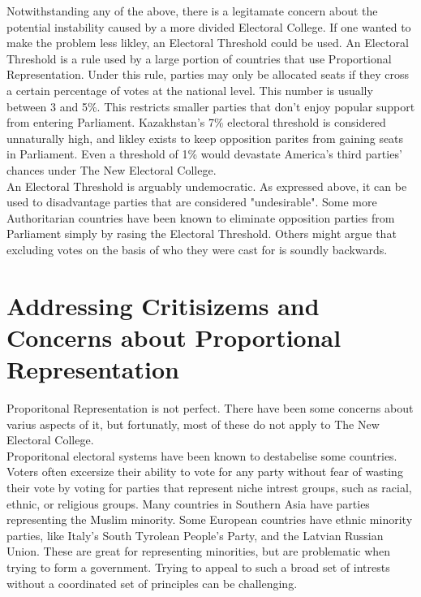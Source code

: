 \documentclass{article}
\begin{document}
    Notwithstanding any of the above, there is a legitamate concern about the potential instability caused by a more divided Electoral College. If one wanted to make the problem less likley, an Electoral Threshold could be used. An Electoral Threshold is a rule used by a large portion of countries that use Proportional Representation. Under this rule, parties may only be allocated seats if they cross a certain percentage of votes at the national level. This number is usually between 3 and 5\%. This restricts smaller parties that don't enjoy popular support from entering Parliament. Kazakhstan's 7\% electoral threshold is considered unnaturally high, and likley exists to keep opposition parites from gaining seats in Parliament. Even a threshold of 1\% would devastate America's third parties' chances under The New Electoral College.\\

    An Electoral Threshold is arguably undemocratic. As expressed above, it can be used to disadvantage parties that are considered "undesirable". Some more Authoritarian countries have been known to eliminate opposition parties from Parliament simply by rasing the Electoral Threshold. Others might argue that excluding votes on the basis of who they were cast for is soundly backwards.\\

    \section{Addressing Critisizems and Concerns about Proportional Representation}

    Proporitonal Representation is not perfect. There have been some concerns about varius aspects of it, but fortunatly, most of these do not apply to The New Electoral College.\\

    Proporitonal electoral systems have been known to destabelise some countries. Voters often excersize their ability to vote for any party without fear of wasting their vote by voting for parties that represent niche intrest groups, such as racial, ethnic, or religious groups. Many countries in Southern Asia have parties representing the Muslim minority. Some European countries have ethnic minority parties, like Italy's South Tyrolean People's Party, and the Latvian Russian Union. These are great for representing minorities, but are problematic when trying to form a government. Trying to appeal to such a broad set of intrests without a coordinated set of principles can be challenging.\\
\end{document}
